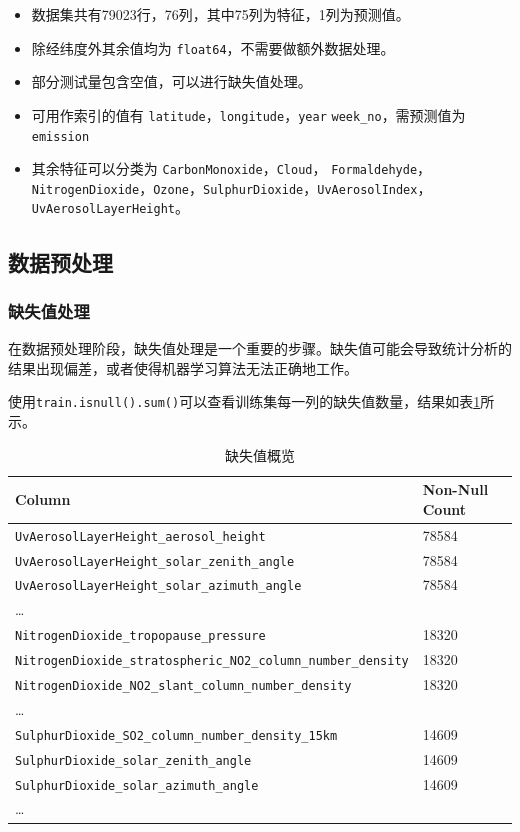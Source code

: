\documentclass{ctexart}
\begin{document}
\begin{itemize}
      \item 数据集共有79023行，76列，其中75列为特征，1列为预测值。
      \item 除经纬度外其余值均为 \texttt{float64}，不需要做额外数据处理。
      \item 部分测试量包含空值，可以进行缺失值处理。
      \item 可用作索引的值有 \texttt{latitude}，\texttt{longitude}，\texttt{year} \texttt{week\_no}，需预测值为 \texttt{emission}
      \item 其余特征可以分类为 \texttt{CarbonMonoxide}，\texttt{Cloud}， \texttt{Formaldehyde}，\texttt{NitrogenDioxide}，\texttt{Ozone}，\texttt{SulphurDioxide}，\texttt{UvAerosolIndex}，\texttt{UvAerosolLayerHeight}。
\end{itemize}

\subsection{数据预处理}

\subsubsection{缺失值处理}

在数据预处理阶段，缺失值处理是一个重要的步骤。缺失值可能会导致统计分析的结果出现偏差，或者使得机器学习算法无法正确地工作。

使用\verb|train.isnull().sum()|可以查看训练集每一列的缺失值数量，结果如表\ref{tab:1}所示。

\begin{table}[h]
      \centering
      \begin{tabular}{l|l}
      \hline
      Column & Non-Null Count \\ \hline
      \texttt{UvAerosolLayerHeight\_aerosol\_height} & 78584 \\
      \texttt{UvAerosolLayerHeight\_solar\_zenith\_angle} & 78584 \\
      \texttt{UvAerosolLayerHeight\_solar\_azimuth\_angle} & 78584 \\
      \ldots{} & \\
      \texttt{NitrogenDioxide\_tropopause\_pressure} & 18320 \\
      \texttt{NitrogenDioxide\_stratospheric\_NO2\_column\_number\_density} & 18320 \\
      \texttt{NitrogenDioxide\_NO2\_slant\_column\_number\_density} & 18320 \\
      \ldots{} & \\
      \texttt{SulphurDioxide\_SO2\_column\_number\_density\_15km} & 14609 \\
      \texttt{SulphurDioxide\_solar\_zenith\_angle} & 14609 \\
      \texttt{SulphurDioxide\_solar\_azimuth\_angle} & 14609 \\
      \ldots{} & \\
      \hline
      \end{tabular}
      \caption{\label{tab:1}缺失值概览}
\end{table}
\end{document}
